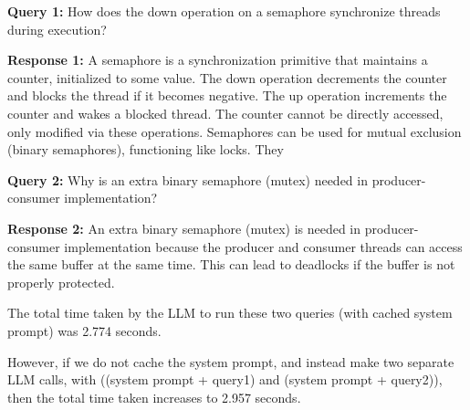 \begin{tcolorbox}[colback=gray!10, colframe=gray!60!black, sharp corners, boxrule=0.5pt, left=4pt, right=4pt, top=4pt, bottom=4pt]
\small
\textbf{Query 1:} How does the down operation on a semaphore synchronize threads during execution?
\end{tcolorbox}

\begin{tcolorbox}[colback=gray!10, colframe=gray!60!black, sharp corners, boxrule=0.5pt, left=4pt, right=4pt, top=4pt, bottom=4pt]
\small
\textbf{Response 1:} A semaphore is a synchronization primitive that maintains a counter, initialized to some value. The down operation decrements the counter and blocks the thread if it becomes negative. The up operation increments the counter and wakes a blocked thread. The counter cannot be directly accessed, only modified via these operations.
Semaphores can be used for mutual exclusion (binary semaphores), functioning like locks. They
\end{tcolorbox}


\begin{tcolorbox}[colback=gray!10, colframe=gray!60!black, sharp corners, boxrule=0.5pt, left=4pt, right=4pt, top=4pt, bottom=4pt]
\small
\textbf{Query 2:} Why is an extra binary semaphore (mutex) needed in producer-consumer implementation?
\end{tcolorbox}

\begin{tcolorbox}[colback=gray!10, colframe=gray!60!black, sharp corners, boxrule=0.5pt, left=4pt, right=4pt, top=4pt, bottom=4pt]
\small
\textbf{Response 2:} An extra binary semaphore (mutex) is needed in producer-consumer implementation because the producer and consumer threads can access the same buffer at the same time. This can lead to deadlocks if the buffer is not properly protected.
\end{tcolorbox}


The total time taken by the LLM to run these two queries (with cached system prompt) was 2.774 seconds.


However, if we do not cache the system prompt, and instead make two separate LLM calls, with ((system prompt + query1) and (system prompt + query2)), then the total time taken increases to 2.957 seconds.


